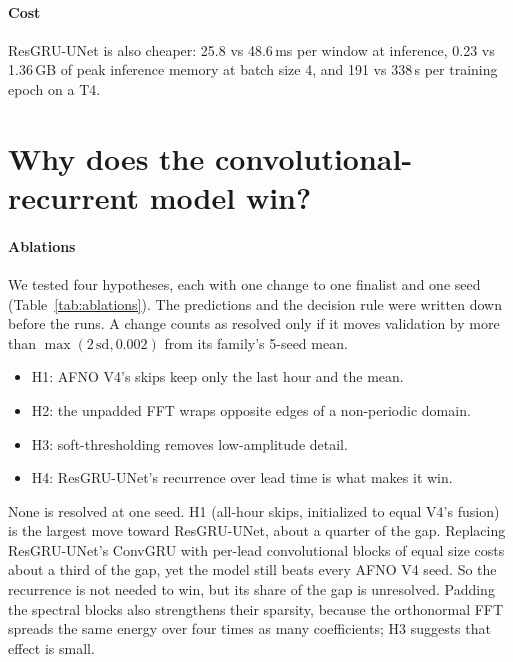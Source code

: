 \documentclass[10pt]{article}
\begin{document}
\paragraph{Cost}
ResGRU-UNet is also cheaper: 25.8 vs 48.6\,ms per window at inference, 0.23 vs 1.36\,GB of peak inference memory at batch size 4, and 191 vs 338\,s per training epoch on a T4.

\section{Why does the convolutional-recurrent model win?}
\label{sec:why}

\paragraph{Ablations}
We tested four hypotheses, each with one change to one finalist and one seed (Table~\ref{tab:ablations}). The predictions and the decision rule were written down before the runs. A change counts as resolved only if it moves validation by more than $\max(2\,\mathrm{sd},0.002)$ from its family's 5-seed mean.
\begin{itemize}[leftmargin=14pt]
\item H1: AFNO V4's skips keep only the last hour and the mean.
\item H2: the unpadded FFT wraps opposite edges of a non-periodic domain.
\item H3: soft-thresholding removes low-amplitude detail.
\item H4: ResGRU-UNet's recurrence over lead time is what makes it win.
\end{itemize}
None is resolved at one seed. H1 (all-hour skips, initialized to equal V4's fusion) is the largest move toward ResGRU-UNet, about a quarter of the gap. Replacing ResGRU-UNet's ConvGRU with per-lead convolutional blocks of equal size costs about a third of the gap, yet the model still beats every AFNO V4 seed. So the recurrence is not needed to win, but its share of the gap is unresolved. Padding the spectral blocks also strengthens their sparsity, because the orthonormal FFT spreads the same energy over four times as many coefficients; H3 suggests that effect is small.
\end{document}
